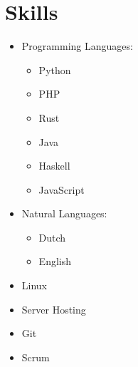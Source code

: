 \documentclass[a4paper,12pt]{article}
\begin{document}
\section{Skills}
\begin{multicol}{2}
\begin{itemize}
    \item Programming Languages:
        \begin{itemize}
            \item Python
            \item PHP
            \item Rust
            \item Java
            \item Haskell
            \item JavaScript
        \end{itemize}
    \item Natural Languages:
        \begin{itemize}
            \item Dutch
            \item English
        \end{itemize}
    \item Linux
    \item Server Hosting
    \item Git
    \item Scrum
\end{itemize}
\end{multicol}

\vfill
{}
\end{document}
